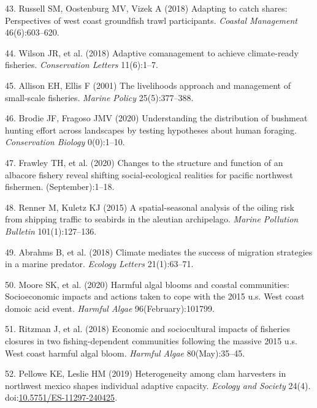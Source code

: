 \documentclass[9pt,twocolumn,twoside,lineno]{pnas-new}
\begin{document}
\leavevmode\hypertarget{ref-Russell2018}{}%
43. Russell SM, Oostenburg MV, Vizek A (2018) Adapting to catch shares:
Perspectives of west coast groundfish trawl participants. \emph{Coastal
Management} 46(6):603--620.

\leavevmode\hypertarget{ref-Wilson2018}{}%
44. Wilson JR, et al. (2018) Adaptive comanagement to achieve
climate-ready fisheries. \emph{Conservation Letters} 11(6):1--7.

\leavevmode\hypertarget{ref-Ellis2001}{}%
45. Allison EH, Ellis F (2001) The livelihoods approach and management
of small-scale fisheries. \emph{Marine Policy} 25(5):377--388.

\leavevmode\hypertarget{ref-Brodie2020}{}%
46. Brodie JF, Fragoso JMV (2020) Understanding the distribution of
bushmeat hunting effort across landscapes by testing hypotheses about
human foraging. \emph{Conservation Biology} 0(0):1--10.

\leavevmode\hypertarget{ref-Frawley2020}{}%
47. Frawley TH, et al. (2020) Changes to the structure and function of
an albacore fishery reveal shifting social-ecological realities for
pacific northwest fishermen. (September):1--18.

\leavevmode\hypertarget{ref-Renner2015}{}%
48. Renner M, Kuletz KJ (2015) A spatial-seasonal analysis of the oiling
risk from shipping traffic to seabirds in the aleutian archipelago.
\emph{Marine Pollution Bulletin} 101(1):127--136.

\leavevmode\hypertarget{ref-Abrahms2018}{}%
49. Abrahms B, et al. (2018) Climate mediates the success of migration
strategies in a marine predator. \emph{Ecology Letters} 21(1):63--71.

\leavevmode\hypertarget{ref-Moore2020}{}%
50. Moore SK, et al. (2020) Harmful algal blooms and coastal
communities: Socioeconomic impacts and actions taken to cope with the
2015 u.s. West coast domoic acid event. \emph{Harmful Algae}
96(February):101799.

\leavevmode\hypertarget{ref-Ritzman2018}{}%
51. Ritzman J, et al. (2018) Economic and sociocultural impacts of
fisheries closures in two fishing-dependent communities following the
massive 2015 u.s. West coast harmful algal bloom. \emph{Harmful Algae}
80(May):35--45.

\leavevmode\hypertarget{ref-Pellowe2019}{}%
52. Pellowe KE, Leslie HM (2019) Heterogeneity among clam harvesters in
northwest mexico shapes individual adaptive capacity. \emph{Ecology and
Society} 24(4).
doi:\href{https://doi.org/10.5751/ES-11297-240425}{10.5751/ES-11297-240425}.
\end{document}
